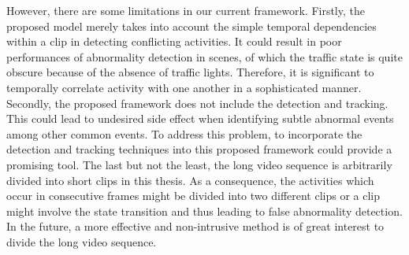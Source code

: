 However, there are some limitations in our current framework. Firstly, the proposed model merely takes into account the simple temporal dependencies within a clip in detecting conflicting activities. It could result in poor performances of abnormality detection in scenes, of which the traffic state is quite obscure because of the absence of traffic lights. Therefore, it is significant to temporally correlate activity with one another in a sophisticated manner. Secondly, the proposed framework does not include the detection and tracking. This could lead to undesired side effect when identifying subtle abnormal events among other common events. To address this problem, to incorporate the detection and tracking techniques into this proposed framework could provide a promising tool. The last but not the least, the long video sequence is arbitrarily divided into short clips in this thesis. As a consequence, the activities which occur in consecutive frames might be divided into two different clips or a clip might involve the state transition and thus leading to false abnormality detection. In the future, a more effective and non-intrusive method is of great interest to divide the long video sequence.
